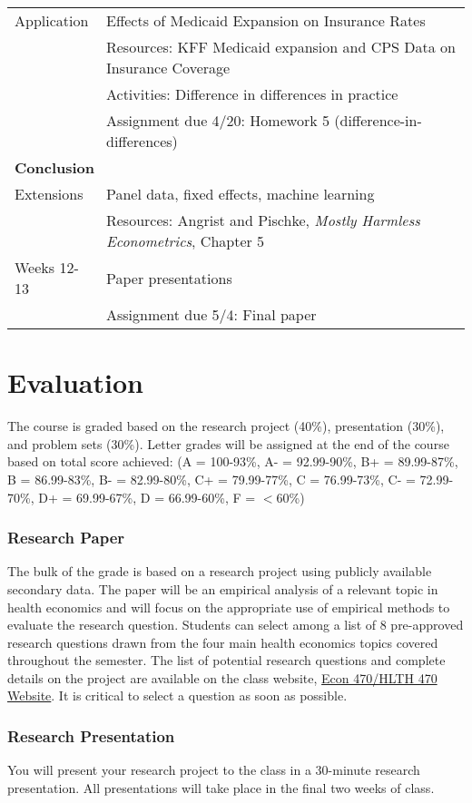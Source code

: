 \documentclass{article}
\begin{document}
\begin{longtable}{lp{13cm}}
  \hline
  Application & Effects of Medicaid Expansion on Insurance Rates \\
              & Resources: KFF Medicaid expansion and CPS Data on Insurance Coverage \\
              & Activities: Difference in differences in practice \citep{courtemanche2017} \\
              & Assignment due 4/20: Homework 5 (difference-in-differences) \\
  \hline
  \multicolumn{2}{l}{\textbf{Conclusion}} \\
  \hline\hline
  Extensions & Panel data, fixed effects, machine learning \\
             & Resources:  Angrist and Pischke, \textit{Mostly Harmless Econometrics}, Chapter 5 \\
  \hline
  Weeks 12-13 & Paper presentations \\
              & Assignment due 5/4: Final paper
\end{longtable}


\section*{Evaluation}
The course is graded based on the research project (40\%), presentation (30\%), and problem sets (30\%). Letter grades will be assigned at the end of the course based on total score achieved:
(A = 100-93\%, A- = 92.99-90\%, B+ = 89.99-87\%, B = 86.99-83\%, B- = 82.99-80\%, C+ = 79.99-77\%, C = 76.99-73\%, C- = 72.99-70\%, D+ = 69.99-67\%, D = 66.99-60\%, F = $<$60\%)


\subsubsection*{Research Paper}
The bulk of the grade is based on a research project using publicly available secondary data. The paper will be an empirical analysis of a relevant topic in health economics and will focus on the appropriate use of empirical methods to evaluate the research question. Students can select among a list of 8 pre-approved research questions drawn from the four main health economics topics covered throughout the semester. The list of potential research questions and complete details on the project are available on the class website, \href{https://imccart.github.io/Econ-470/}{Econ 470/HLTH 470 Website}. It is critical to select a question as soon as possible.

\subsubsection*{Research Presentation}
You will present your research project to the class in a 30-minute research presentation. All presentations will take place in the final two weeks of class.
\end{document}
